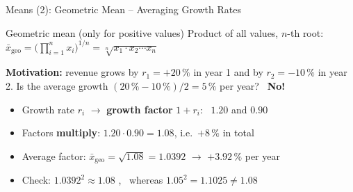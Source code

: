 \documentclass[aspectratio=169,11pt]{beamer}
\begin{document}
\begin{frame}{Means (2): Geometric Mean -- Averaging Growth Rates}
  \begin{block}{Geometric mean (only for positive values)}
    Product of all values, $n$-th root:
    \quad $\bar{x}_{\text{geo}} = \bigl(\prod_{i=1}^{n} x_i\bigr)^{1/n} = \sqrt[n]{x_1 \cdot x_2 \cdots x_n}$
  \end{block}
  \textbf{Motivation:} revenue grows by $r_1 = +20\,\%$ in year 1 and by $r_2 = -10\,\%$ in year 2.
  Is the average growth $(20\,\% - 10\,\%)/2 = 5\,\%$ per year? \ \textbf{No!}
  \begin{itemize}
    \item Growth rate $r_i$ $\to$ \textbf{growth factor} $1 + r_i$: \ $1.20$ and $0.90$
    \item Factors \textbf{multiply}: $1.20 \cdot 0.90 = 1.08$, i.e.\ $+8\,\%$ in total
    \item Average factor: $\bar{x}_{\text{geo}} = \sqrt{1.08} = 1.0392$ $\to$ $\mathbf{+3.92\,\%}$ per year
    \item Check: $1.0392^2 \approx 1.08$ \checkmark, \ whereas $1.05^2 = 1.1025 \neq 1.08$
  \end{itemize}
\end{frame}
\end{document}
